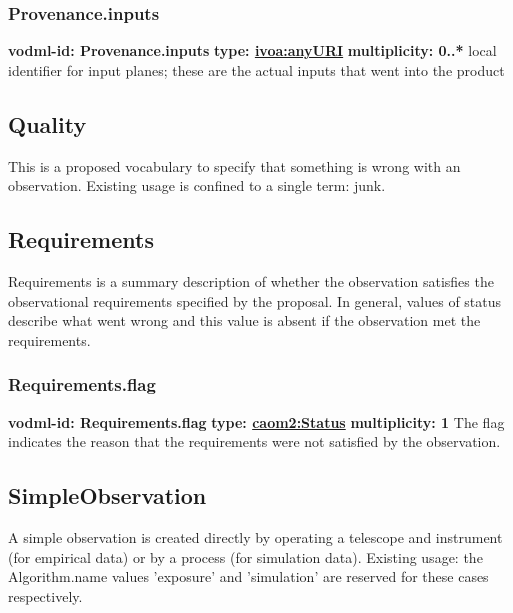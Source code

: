     \subsubsection{Provenance.inputs}
      \textbf{vodml-id: Provenance.inputs} \newline
      \textbf{type: \hyperref[sect:ivoa]{ivoa:anyURI}} \newline
      \textbf{multiplicity: 0..*} \newline
      local identifier for input planes; these are the actual inputs that went into the product

  \subsection{Quality}
  \label{sect:Quality}
    This is a proposed vocabulary to specify that something is wrong with an observation. Existing usage is confined to a single term: junk.

  \subsection{Requirements}
  \label{sect:Requirements}
    Requirements is a summary description of whether the observation satisfies the observational requirements specified by the proposal. In general, values of status describe what went wrong and this value is absent if the observation met the requirements.

    \subsubsection{Requirements.flag}
      \textbf{vodml-id: Requirements.flag} \newline
      \textbf{type: \hyperref[sect:Status]{caom2:Status}} \newline
      \textbf{multiplicity: 1} \newline
      The flag indicates the reason that the requirements were not satisfied by the observation.

  \subsection{SimpleObservation}
  \label{sect:SimpleObservation}
    A simple observation is created directly by operating a telescope and instrument (for empirical data) or by a process (for simulation data). Existing usage: the Algorithm.name values 'exposure' and 'simulation' are reserved for these cases respectively.

